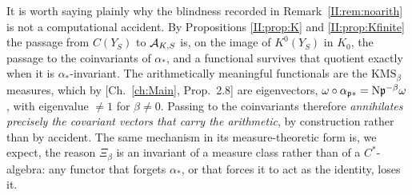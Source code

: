 It is worth saying plainly why the blindness recorded in Remark~\ref{II:rem:noarith} is not a
computational accident. By Propositions \ref{II:prop:K} and \ref{II:prop:Kfinite} the passage
from $C(Y_S)$ to $\mathcal{A}_{K,S}$ is, on the image of $K^0(Y_S)$ in $K_0$, the passage to the
coinvariants of $\alpha_*$, and a functional survives that quotient exactly when it is
$\alpha_*$-invariant. The arithmetically
meaningful functionals are the $\mathrm{KMS}_\beta$ measures, which by
[Ch.~\ref{ch:Main}, Prop.~2.8] are eigenvectors,
$\omega\circ\alpha_{\mathfrak{p}*}=\mathrm{N}\mathfrak{p}^{-\beta}\omega$, with eigenvalue $\ne1$ for $\beta\ne0$.
Passing to the coinvariants therefore \emph{annihilates precisely the covariant vectors that
carry the arithmetic}, by construction rather than by accident. The same mechanism in its
measure-theoretic form is, we expect, the reason $\Xi_\beta$ is an
invariant of a measure class rather than of a $C^*$-algebra: any functor that forgets
$\alpha_*$, or that forces it to act as the identity, loses it.

